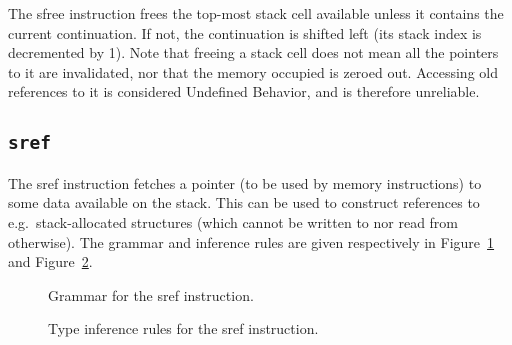 The {\Iformat sfree} instruction frees the top-most stack cell available unless it contains the current continuation.
If not, the continuation is shifted left (its stack index is decremented by 1).
Note that freeing a stack cell does not mean all the pointers to it are invalidated, nor that the memory occupied is zeroed out.
Accessing old references to it is considered Undefined Behavior, and is therefore unreliable.

\subsection{\texttt{sref}}\label{subsec:nstar-instructionset-stack-sref}

The {\Iformat sref} instruction fetches a pointer (to be used by memory instructions) to some data available on the stack.
This can be used to construct references to e.g.\ stack-allocated structures (which cannot be written to nor read from otherwise).
The grammar and inference rules are given respectively in Figure~\ref{fig:nstar-instructionset-stack-sref-grammar} and Figure~\ref{fig:nstar-instructionset-stack-sref-typerules}.

\begin{figure}[H]
	\centering


	\caption{Grammar for the {\Iformat sref} instruction.}
	\label{fig:nstar-instructionset-stack-sref-grammar}
\end{figure}

\begin{figure}[H]
	\centering


	\caption{Type inference rules for the {\Iformat sref} instruction.}
	\label{fig:nstar-instructionset-stack-sref-typerules}
\end{figure}

